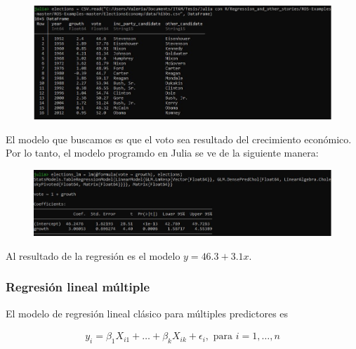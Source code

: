 \begin{figure}[H]
\begin{center}
\includegraphics[scale=0.5]{Imagenes/elections_dataframe.JPG}
  \label{elections_dataframe}
\end{center}
\end{figure}

El modelo que buscamos es que el voto sea resultado del crecimiento económico. Por lo tanto, el modelo programdo en Julia se ve de la siguiente manera:

\begin{figure}[h]
\begin{center}
\includegraphics[scale=0.5]{Imagenes/elections_modelo.JPG}
  \label{elections_modelo}
\end{center}
\end{figure}

Al resultado de la regresión es el modelo $y = 46.3 + 3.1x$. 


\subsubsection{Regresión lineal múltiple}


El modelo de regresión lineal clásico para múltiples predictores es 

\begin{equation*}
    \begin{aligned}
    y_i = \beta_1 X_{i1} + \dots + \beta_k X_{ik} + \epsilon_i, \text{ para } i = 1, \dots, n
    \end{aligned}
\end{equation*}

